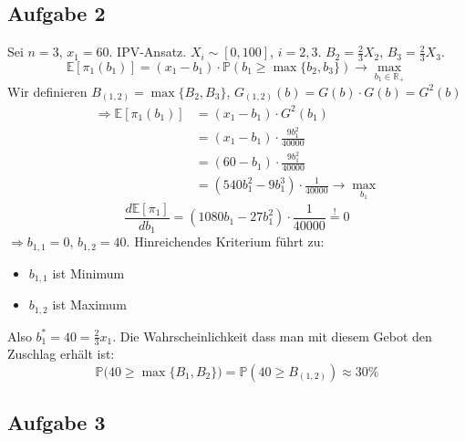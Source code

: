\documentclass[12pt]{extreport} %
\newcommand{\R}{\mathbb{R}}
\theoremstyle{named}
\theoremstyle{nnamed}
\theoremstyle{itshape}
\theoremstyle{normal}
\begin{document}
\subsection*{Aufgabe 2}

Sei $n = 3$, $x_1 = 60$. IPV-Ansatz. $X_i \sim [0, 100]$, $i = 2,3$. $B_2 = \frac{2}{3} X_2$, $B_3 = \frac{2}{3} X_3$.
$$ \mathds{E} \left[ \pi_1(b_1) \right] = \left( x_1 - b_1 \right) \cdot \mathds{P} \left( b_1 \geq \max \{ b_2, b_3 \} \right) \rightarrow \max_{b_1 \in \R_+} $$
Wir definieren $B_{(1,2)} = \max \{ B_2, B_3 \}$, $G_{(1,2)}(b) = G(b) \cdot G(b) = G^{2}(b)$
\begin{align*}
	\Rightarrow \mathds{E} \left[ \pi_1(b_1) \right] & = (x_1 - b_1) \cdot G^{2}(b_1) \\
				& = (x_1 - b_1) \cdot \frac{9 b_1^2}{40000} \\
				& = (60 - b_1) \cdot \frac{9 b_1^2}{40000} \\
				& = \left( 540 b_1^2 - 9 b_1^3 \right) \cdot \frac{
				1}{40000} \rightarrow \max_{b_1}
\end{align*}
$$ \frac{d \mathds{E}[\pi_1]}{d b_1} = \left( 1080 b_1 - 27 b_1^2 \right) \cdot \frac{1}{40000} \overset{!}{=} 0 $$
$\Rightarrow b_{1,1} = 0$, $b_{1,2} = 40$. Hinreichendes Kriterium führt zu: 
\begin{itemize}
	\item $b_{1,1}$ ist Minimum
	\item $b_{1,2}$ ist Maximum
\end{itemize}
Also $b_1^* = 40 = \frac{2}{3} x_1$. Die Wahrscheinlichkeit dass man mit diesem Gebot den Zuschlag erhält ist:
$$ \mathds{P} \big( 40 \geq \max \{ B_1, B_2 \} \big) = \mathds{P} \left( 40 \geq B_{(1,2)} \right) \approx 30 \% $$

\subsection*{Aufgabe 3}
\end{document}

